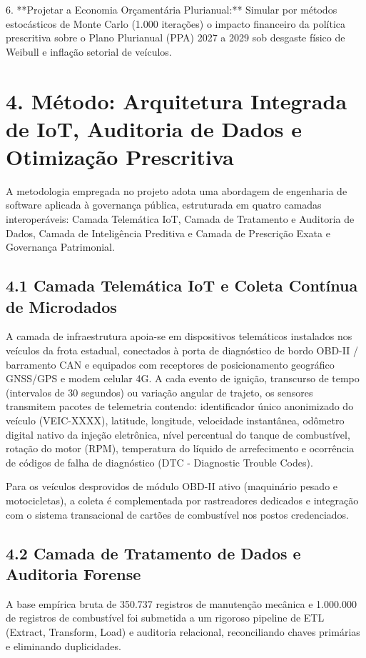 \documentclass[10pt,a4paper,journal]{article}
\begin{document}
6. **Projetar a Economia Orçamentária Plurianual:** Simular por métodos estocásticos de Monte Carlo (1.000 iterações) o impacto financeiro da política prescritiva sobre o Plano Plurianual (PPA) 2027 a 2029 sob desgaste físico de Weibull e inflação setorial de veículos.

\section{4. Método: Arquitetura Integrada de IoT, Auditoria de Dados e Otimização Prescritiva}
A metodologia empregada no projeto adota uma abordagem de engenharia de software aplicada à governança pública, estruturada em quatro camadas interoperáveis: Camada Telemática IoT, Camada de Tratamento e Auditoria de Dados, Camada de Inteligência Preditiva e Camada de Prescrição Exata e Governança Patrimonial.

\subsection{4.1 Camada Telemática IoT e Coleta Contínua de Microdados}
A camada de infraestrutura apoia-se em dispositivos telemáticos instalados nos veículos da frota estadual, conectados à porta de diagnóstico de bordo OBD-II / barramento CAN e equipados com receptores de posicionamento geográfico GNSS/GPS e modem celular 4G. A cada evento de ignição, transcurso de tempo (intervalos de 30 segundos) ou variação angular de trajeto, os sensores transmitem pacotes de telemetria contendo: identificador único anonimizado do veículo (VEIC-XXXX), latitude, longitude, velocidade instantânea, odômetro digital nativo da injeção eletrônica, nível percentual do tanque de combustível, rotação do motor (RPM), temperatura do líquido de arrefecimento e ocorrência de códigos de falha de diagnóstico (DTC - Diagnostic Trouble Codes).

Para os veículos desprovidos de módulo OBD-II ativo (maquinário pesado e motocicletas), a coleta é complementada por rastreadores dedicados e integração com o sistema transacional de cartões de combustível nos postos credenciados.

\subsection{4.2 Camada de Tratamento de Dados e Auditoria Forense}
A base empírica bruta de 350.737 registros de manutenção mecânica e 1.000.000 de registros de combustível foi submetida a um rigoroso pipeline de ETL (Extract, Transform, Load) e auditoria relacional, reconciliando chaves primárias e eliminando duplicidades.
\end{document}
